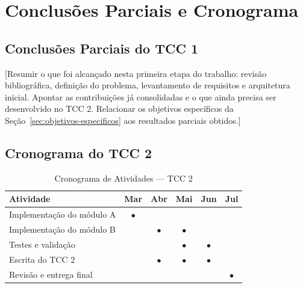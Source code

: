 \section{Conclusões Parciais e Cronograma}
\label{sec:conclusoes}

\subsection{Conclusões Parciais do TCC 1}
\label{sec:conclusoes-parciais}

[Resumir o que foi alcançado nesta primeira etapa do trabalho:
revisão bibliográfica, definição do problema, levantamento de requisitos e arquitetura inicial.
Apontar as contribuições já consolidadas e o que ainda precisa ser desenvolvido no TCC 2.
Relacionar os objetivos específicos da Seção~\ref{sec:objetivos-especificos}
aos resultados parciais obtidos.]

\subsection{Cronograma do TCC 2}
\label{sec:cronograma}

\begin{table}[h]
\caption{Cronograma de Atividades --- TCC 2}
\label{tab:cronograma}
\centering
\begin{tabularx}{\columnwidth}{Xccccc}
\toprule
\textbf{Atividade}        & \textbf{Mar} & \textbf{Abr} & \textbf{Mai} & \textbf{Jun} & \textbf{Jul} \\
\midrule
Implementação do módulo A & $\bullet$    &              &              &              &              \\
Implementação do módulo B &              & $\bullet$    & $\bullet$    &              &              \\
Testes e validação        &              &              & $\bullet$    & $\bullet$    &              \\
Escrita do TCC 2          &              & $\bullet$    & $\bullet$    & $\bullet$    &              \\
Revisão e entrega final   &              &              &              &              & $\bullet$    \\
\bottomrule
\end{tabularx}
\end{table}

